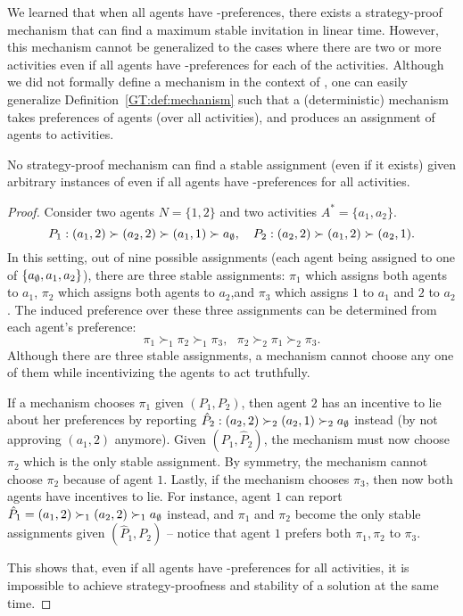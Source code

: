 We learned that when all agents have \INC-preferences, there exists a strategy-proof mechanism that can find a maximum stable invitation in linear time. However, this mechanism cannot be generalized to the cases where there are two or more activities even if all agents have \INC-preferences for each of the activities. Although we did not formally define a mechanism in the context of \GASP, one can easily generalize Definition~\ref{GT:def:mechanism} such that a (deterministic) mechanism takes preferences of agents (over all activities), and produces an assignment of agents to activities. 
\begin{theorem} \label{GT:thm:impossibility_inc_gasp}
No strategy-proof mechanism can find a stable assignment (even if it exists) given arbitrary instances of \GASPs even if all agents have \INC-preferences for all activities. 
\end{theorem}
\begin{proof} 
Consider two agents $N = \{1, 2\}$ and two activities $A^* = \{a_1, a_2\}$.
	\begin{equation*}
		P_1: (a_1, 2) \succ (a_2, 2) \succ (a_1, 1) \succ a_{\emptyset}, ~~~
		P_2: (a_2, 2) \succ (a_1, 2) \succ (a_2, 1).
	\end{equation*}
In this setting, out of nine possible assignments (each agent being assigned to one of $\{a_{\emptyset}, a_1, a_2\}$), there are three stable assignments: $\pi_1$ which assigns both agents to $a_1$, $\pi_2$ which assigns both agents to $a_2$,and $\pi_3$ which assigns $1$ to $a_1$ and $2$ to $a_2$.
The induced preference over these three assignments can be determined from each agent's preference: 
	\begin{equation*}
		\pi_1 \succ_1 \pi_2 \succ_1 \pi_3, ~~~
		\pi_2 \succ_2 \pi_1 \succ_2 \pi_3.
	\end{equation*} 
Although there are three stable assignments, a mechanism cannot choose any one of them while incentivizing the agents to act truthfully.

If a mechanism chooses $\pi_1$ given $(P_1, P_2)$, then agent $2$ has an incentive to lie about her preferences by reporting $\hat{P}_2: (a_2, 2) \succ_2 (a_2, 1) \succ_2 a_{\emptyset}$ instead (by not approving $(a_1, 2)$ anymore). Given $(P_1, \hat{P}_2)$, the mechanism must now choose $\pi_2$ which is the only stable assignment. 
By symmetry, the mechanism cannot choose $\pi_2$ because of agent $1$.
Lastly, if the mechanism chooses $\pi_3$, then now both agents have incentives to lie. For instance, agent $1$ can report $\hat{P}_1 = (a_1, 2) \succ_1 (a_2, 2) \succ_1 a_{\emptyset}$ instead, and $\pi_1$ and $\pi_2$ become the only stable assignments given $(\hat{P}_1, P_2)$ -- notice that agent $1$ prefers both $\pi_1, \pi_2$ to $\pi_3$. 

This shows that, even if all agents have \INC-preferences for all activities, it is impossible to achieve strategy-proofness and stability of a solution at the same time.
\end{proof}


